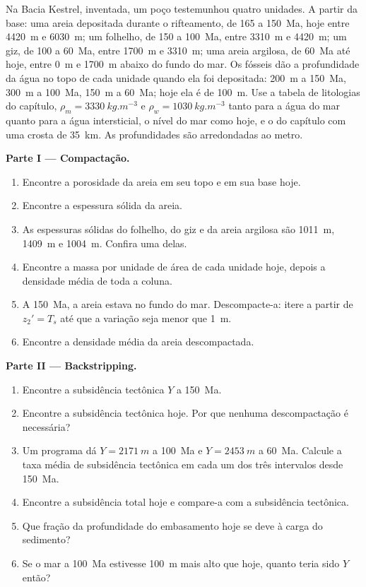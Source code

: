 \begin{problem}\label{pb:b2:basins-compared:1}
Na Bacia Kestrel, inventada, um poço testemunhou quatro unidades. A partir da base: uma areia depositada durante
o rifteamento, de 165 a \qty{150}{Ma}, hoje entre \qty{4420}{m} e \qty{6030}{m}; um folhelho, de 150
a \qty{100}{Ma}, entre \qty{3310}{m} e \qty{4420}{m}; um giz, de 100 a \qty{60}{Ma}, entre
\qty{1700}{m} e \qty{3310}{m}; uma areia argilosa, de \qty{60}{Ma} até hoje, entre \qty{0}{m} e
\qty{1700}{m} abaixo do fundo do mar. Os fósseis dão a profundidade da água no topo de cada unidade quando ela
foi depositada: \qty{200}{m} a \qty{150}{Ma}, \qty{300}{m} a \qty{100}{Ma}, \qty{150}{m} a
\qty{60}{Ma}; hoje ela é de \qty{100}{m}. Use a tabela de litologias do capítulo, $\rho_m =
\qty{3330}{kg.m^{-3}}$ e $\rho_w = \qty{1030}{kg.m^{-3}}$ tanto para a água do mar quanto para a água intersticial, o nível do mar
como hoje, e o  do capítulo com uma crosta de \qty{35}{km}. As profundidades são arredondadas
ao metro.

\noindent\textbf{Parte I --- Compactação.}
\begin{enumerate}
  \item Encontre a porosidade da areia em seu topo e em sua base hoje.
  \item Encontre a espessura sólida da areia.
  \item As espessuras sólidas do folhelho, do giz e da areia argilosa são \qty{1011}{m},
        \qty{1409}{m} e \qty{1004}{m}. Confira uma delas.
  \item Encontre a massa por unidade de área de cada unidade hoje, depois a densidade média de toda a
        coluna.
  \item A \qty{150}{Ma}, a areia estava no fundo do mar. Descompacte-a: itere a partir de $z_2' =
        T_s$ até que a variação seja menor que \qty{1}{m}.
  \item Encontre a densidade média da areia descompactada.
\end{enumerate}

\noindent\textbf{Parte II --- Backstripping.}
\begin{enumerate}[resume]
  \item Encontre a subsidência tectônica $Y$ a \qty{150}{Ma}.
  \item Encontre a subsidência tectônica hoje. Por que nenhuma descompactação é necessária?
  \item Um programa dá $Y = \qty{2171}{m}$ a \qty{100}{Ma} e $Y = \qty{2453}{m}$ a
        \qty{60}{Ma}. Calcule a taxa média de subsidência tectônica em cada um dos três
        intervalos desde \qty{150}{Ma}.
  \item Encontre a subsidência total hoje e compare-a com a subsidência tectônica.
  \item Que fração da profundidade do embasamento hoje se deve à carga do sedimento?
  \item Se o mar a \qty{100}{Ma} estivesse \qty{100}{m} mais alto que hoje, quanto teria sido $Y$
        então?
\end{enumerate}


\end{problem}
